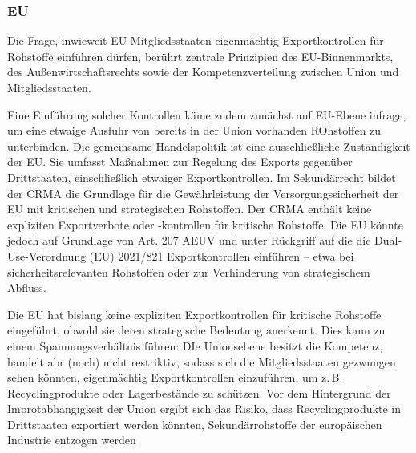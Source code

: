 \documentclass[12pt,a4paper,oneside]{book} %
\begin{document}

\subsubsection{EU}

Die Frage, inwieweit EU-Mitgliedsstaaten eigenmächtig Exportkontrollen für Rohstoffe einführen dürfen, berührt zentrale Prinzipien des EU-Binnenmarkts, des Außenwirtschaftsrechts sowie der Kompetenzverteilung zwischen Union und Mitgliedsstaaten.

Eine Einführung solcher Kontrollen käme zudem zunächst auf EU-Ebene infrage, um eine etwaige Ausfuhr von bereits in der Union vorhanden ROhstoffen zu unterbinden. Die gemeinsame Handelspolitik ist eine ausschließliche Zuständigkeit der EU. Sie umfasst Maßnahmen zur Regelung des Exports gegenüber Drittstaaten, einschließlich etwaiger Exportkontrollen. Im Sekundärrecht bildet der CRMA die Grundlage für die Gewährleistung der Versorgungssicherheit der EU mit kritischen und strategischen Rohstoffen. Der CRMA enthält keine expliziten Exportverbote oder -kontrollen für kritische Rohstoffe. Die EU könnte jedoch auf Grundlage von Art. 207 AEUV und unter Rückgriff auf die die Dual-Use-Verordnung (EU) 2021/821 Exportkontrollen einführen – etwa bei sicherheitsrelevanten Rohstoffen oder zur Verhinderung von strategischem Abfluss.

Die EU hat bislang keine expliziten Exportkontrollen für kritische Rohstoffe eingeführt, obwohl sie deren strategische Bedeutung anerkennt. Dies kann zu einem Spannungsverhältnis führen: DIe Unionsebene besitzt die Kompetenz, handelt abr (noch) nicht restriktiv, sodass sich die Mitgliedsstaaten gezwungen  sehen könnten, eigenmächtig Exportkontrollen einzuführen, um z. B. Recyclingprodukte oder Lagerbestände zu schützen. Vor dem Hintergrund der Improtabhängigkeit der Union ergibt sich das Risiko, dass Recyclingprodukte in Drittstaaten exportiert werden könnten, Sekundärrohstoffe der europäischen Industrie entzogen werden
\end{document}
